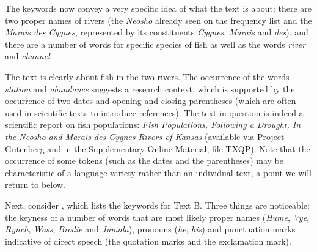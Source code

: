 The keywords  now convey a very specific idea of what the text is about: there are two proper names of rivers (the \textit{Neosho} already seen on the frequency  list and the \textit{Marais des Cygnes}, represented by its constituents \textit{Cygnes}, \textit{Marais} and \textit{des}), and there are a number of words for specific species of fish as well as the words \textit{river} and \textit{channel}.

The text is clearly about fish in the two rivers. The occurrence of the words \textit{station} and \textit{abundance} suggests a research context, which is supported by the occurrence of two dates and opening and closing parentheses (which are often used in scientific texts to introduce references). The text in question is indeed a scientific report on fish populations: \textit{Fish Populations, Following a Drought, In the Neosho and Marais des Cygnes Rivers of Kansas} (available via Project Gutenberg and in the Supplementary Online Material, file TXQP). Note that the occurrence of some tokens  (such as the dates and the parentheses) may be characteristic of a language variety  rather than an individual text, a point we will return to below.\largerpage[-1]

Next, consider , which lists the keywords  for Text B. Three things are noticeable: the keyness  of a number of words that are most likely proper names (\textit{Hume}, \textit{Vye}, \textit{Rynch}, \textit{Wass}, \textit{Brodie} and \textit{Jumala}), pronouns  (\textit{he}, \textit{his}) and punctuation marks indicative of direct speech (the quotation marks and the exclamation mark).\largerpage[-1]

